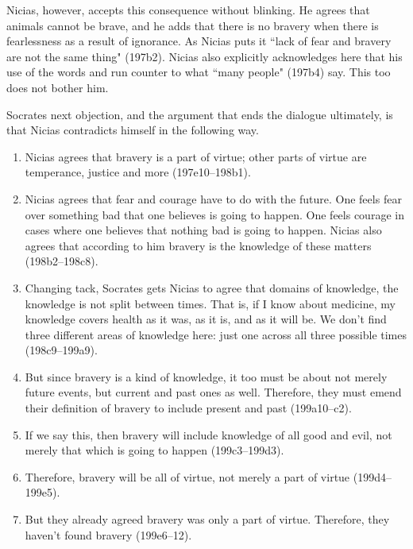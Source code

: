 \documentclass[11pt]{article}
\begin{document}
Nicias, however, accepts this consequence without blinking.  He agrees that
animals cannot be brave, and he adds that there is no bravery when there is
fearlessness as a result of ignorance.  As Nicias puts it ``lack of fear
and bravery are not the same thing" (197b2).  Nicias also explicitly
acknowledges here that his use of the words  and 
run counter to what ``many people" (197b4) say.  This too does not bother
him.

Socrates next objection, and the argument that ends the dialogue
ultimately, is that Nicias contradicts himself in the following way.

\begin{enumerate}

    \item Nicias agrees that bravery is a part of virtue; other parts of
        virtue are temperance, justice and more (197e10--198b1).

    \item Nicias agrees that fear and courage have to do with the future.
        One feels fear over something bad that one believes is going to
        happen.  One feels courage in cases where one believes that nothing
        bad is going to happen.  Nicias also agrees that according to him
        bravery is the knowledge of these matters (198b2--198c8).

    \item Changing tack, Socrates gets Nicias to agree that domains of
        knowledge, the knowledge is not split between times.  That is, if
        I know about medicine, my knowledge covers health as it was, as it
        is, and as it will be.  We don't find three different areas of
        knowledge here: just one across all three possible times
        (198c9--199a9).

    \item But since bravery is a kind of knowledge, it too must be about
        not merely future events, but current and past ones as well.
        Therefore, they must emend their definition of bravery to include
        present and past (199a10--c2).

    \item If we say this, then bravery will include knowledge of all good
        and evil, not merely that which is going to happen (199c3--199d3).

    \item Therefore, bravery will be all of virtue, not merely a part of
        virtue (199d4--199e5).

    \item But they already agreed bravery was only a part of virtue.
        Therefore, they haven't found bravery (199e6--12).

\end{enumerate}
\end{document}
